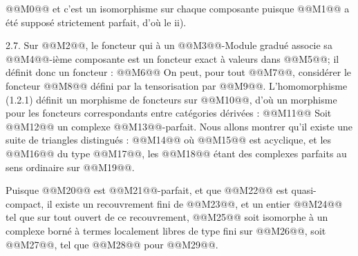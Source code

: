 
@@M0@@
et c'est un
isomorphisme sur chaque composante puisque @@M1@@ a été supposé strictement parfait, d'où le ii).

2.7. Sur @@M2@@, le foncteur qui à un @@M3@@-Module gradué associe sa @@M4@@-ième composante est un foncteur exact à valeurs dans @@M5@@; il définit donc un foncteur :
@@M6@@
On peut, pour tout @@M7@@, considérer le foncteur @@M8@@ défini par la tensorisation par @@M9@@. L'homomorphisme (1.2.1) définit un morphisme de foncteurs sur @@M10@@, d'où un morphisme pour les foncteurs correspondants entre catégories dérivées :
@@M11@@
Soit @@M12@@ un complexe @@M13@@-parfait. Nous allons montrer qu'il existe une suite de triangles distingués :
@@M14@@
où @@M15@@ est acyclique, et les @@M16@@ du type @@M17@@, les @@M18@@ étant des complexes parfaits au sens ordinaire sur @@M19@@.

Puisque @@M20@@ est @@M21@@-parfait, et que @@M22@@ est quasi-compact, il existe un recouvrement fini de @@M23@@, et un entier @@M24@@ tel que sur tout ouvert de ce recouvrement, @@M25@@ soit isomorphe à un complexe borné à termes localement libres de type fini sur @@M26@@, soit @@M27@@, tel que @@M28@@ pour @@M29@@.


